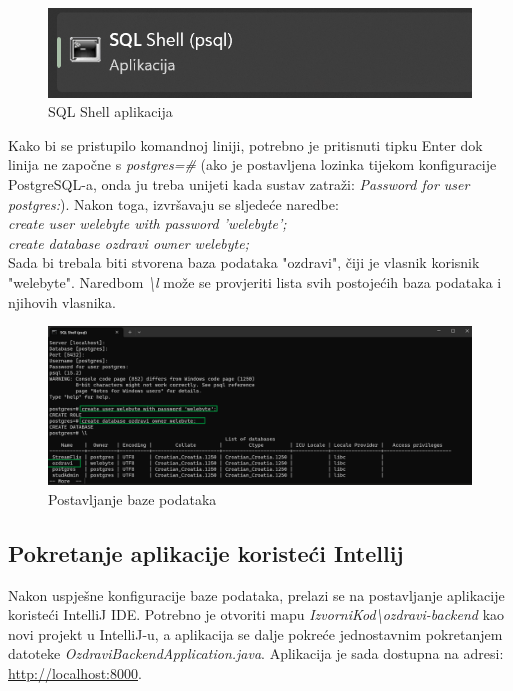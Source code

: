 	\begin{figure}[H]
		\includegraphics[width=\textwidth]{slike/sqlshell1.png} 
		\caption{SQL Shell aplikacija} 
	\end{figure}
	 Kako bi se pristupilo komandnoj liniji, potrebno je pritisnuti tipku Enter dok linija ne započne s \textit{postgres=\#}
	(ako je postavljena lozinka tijekom konfiguracije PostgreSQL-a, onda ju treba unijeti kada sustav zatraži: \textit{Password for user postgres:}). 
	Nakon toga, izvršavaju se sljedeće naredbe:\\
	\textit{create user welebyte with password 'welebyte';\\
	create database ozdravi owner welebyte;}\\
	Sada bi trebala biti stvorena baza podataka "ozdravi", čiji je vlasnik korisnik "welebyte". Naredbom \textit{\textbackslash l} može se provjeriti lista svih postojećih 
	baza podataka i njihovih vlasnika. \\
	\begin{figure}[H]
		\includegraphics[width=\textwidth]{slike/sqlshell2.png} 
		\caption{Postavljanje baze podataka} 
	\end{figure}
	\subsection*{Pokretanje aplikacije koristeći Intellij}
	Nakon uspješne konfiguracije baze podataka, prelazi se na postavljanje aplikacije koristeći IntelliJ IDE. Potrebno je otvoriti mapu \textit{IzvorniKod\textbackslash ozdravi-backend} kao 
	novi projekt u IntelliJ-u, a aplikacija se dalje pokreće jednostavnim pokretanjem datoteke \textit{OzdraviBackendApplication.java}. Aplikacija je sada dostupna na adresi:
	\url{http://localhost:8000}.

